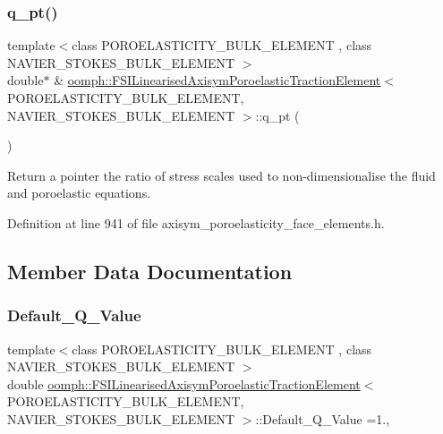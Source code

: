\subsubsection{\texorpdfstring{q\+\_\+pt()}{q\_pt()}}
{\footnotesize\ttfamily template$<$class P\+O\+R\+O\+E\+L\+A\+S\+T\+I\+C\+I\+T\+Y\+\_\+\+B\+U\+L\+K\+\_\+\+E\+L\+E\+M\+E\+NT , class N\+A\+V\+I\+E\+R\+\_\+\+S\+T\+O\+K\+E\+S\+\_\+\+B\+U\+L\+K\+\_\+\+E\+L\+E\+M\+E\+NT $>$ \\
double$\ast$ \& \hyperlink{classoomph_1_1FSILinearisedAxisymPoroelasticTractionElement}{oomph\+::\+F\+S\+I\+Linearised\+Axisym\+Poroelastic\+Traction\+Element}$<$ P\+O\+R\+O\+E\+L\+A\+S\+T\+I\+C\+I\+T\+Y\+\_\+\+B\+U\+L\+K\+\_\+\+E\+L\+E\+M\+E\+NT, N\+A\+V\+I\+E\+R\+\_\+\+S\+T\+O\+K\+E\+S\+\_\+\+B\+U\+L\+K\+\_\+\+E\+L\+E\+M\+E\+NT $>$\+::q\+\_\+pt (\begin{DoxyParamCaption}{ }\end{DoxyParamCaption})\hspace{0.3cm}{\ttfamily [inline]}}



Return a pointer the ratio of stress scales used to non-\/dimensionalise the fluid and poroelastic equations. 



Definition at line 941 of file axisym\+\_\+poroelasticity\+\_\+face\+\_\+elements.\+h.



\subsection{Member Data Documentation}
\mbox{\label{classoomph_1_1FSILinearisedAxisymPoroelasticTractionElement_aa210d70794a163cb3ffb5f335b0f1937}} 
\subsubsection{\texorpdfstring{Default\+\_\+\+Q\+\_\+\+Value}{Default\_Q\_Value}}
{\footnotesize\ttfamily template$<$class P\+O\+R\+O\+E\+L\+A\+S\+T\+I\+C\+I\+T\+Y\+\_\+\+B\+U\+L\+K\+\_\+\+E\+L\+E\+M\+E\+NT , class N\+A\+V\+I\+E\+R\+\_\+\+S\+T\+O\+K\+E\+S\+\_\+\+B\+U\+L\+K\+\_\+\+E\+L\+E\+M\+E\+NT $>$ \\
double \hyperlink{classoomph_1_1FSILinearisedAxisymPoroelasticTractionElement}{oomph\+::\+F\+S\+I\+Linearised\+Axisym\+Poroelastic\+Traction\+Element}$<$ P\+O\+R\+O\+E\+L\+A\+S\+T\+I\+C\+I\+T\+Y\+\_\+\+B\+U\+L\+K\+\_\+\+E\+L\+E\+M\+E\+NT, N\+A\+V\+I\+E\+R\+\_\+\+S\+T\+O\+K\+E\+S\+\_\+\+B\+U\+L\+K\+\_\+\+E\+L\+E\+M\+E\+NT $>$\+::Default\+\_\+\+Q\+\_\+\+Value =1.\hspace{0.3cm}{\ttfamily [static]}, {\ttfamily [protected]}}



